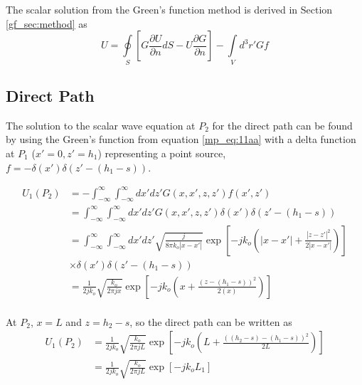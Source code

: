 The scalar solution from the Green's function method is derived in Section \ref{gf_sec:method} as
\begin{equation}
U = \oint\limits_{S}\left[G\frac{\partial U}{\partial n}dS - U\frac{\partial G}{\partial n} \right] -\int\limits_{V}d^3r' Gf
\label{mp_eq:11aaa}
\end{equation}
\renewcommand{\baselinestretch}{2} \small\normalsize

\subsection{Direct Path}
The solution to the scalar wave equation at $P_2$ for the direct path can be found by using the Green's function from equation \ref{mp_eq:11aa} with a delta function at $P_1$ ($x' = 0, z' = h_1$) representing a point source, $f = -\delta(x') \delta(z'- (h_1-s)) $.

\begin{equation}
\begin{aligned}
U_1(P_2) &= -\int_{-\infty}^{\infty} \int_{-\infty}^{\infty}dx' dz' G\left(x,x',z,z' \right) f(x',z') \\
&= \int_{-\infty}^{\infty} \int_{-\infty}^{\infty}dx' dz' G\left(x,x',z,z' \right)\delta(x') \delta(z'- (h_1-s)) \\
&= \int_{-\infty}^{\infty} \int_{-\infty}^{\infty}dx' dz' \sqrt{\frac{j}{8\pi k_o|x-x'|}}\exp\left[-jk_o\left(|x -x'| + \frac{|z-z'|^2}{2|x-x'|}\right) \right] \\
&\times \delta(x') \delta(z'- (h_1-s)) \\
&= \frac{1}{2jk_o}\sqrt{\frac{k_o}{2\pi jx}}\exp\left[-jk_o\left(x + \frac{(z-(h_1-s))^2}{2(x)}\right) \right]\\
\end{aligned}
\label{mp_eq:11ab}
\end{equation}
\renewcommand{\baselinestretch}{2} \small\normalsize

At $P_2$, $x = L$ and $z = h_2-s$, so the direct path can be written as
\begin{equation}
\begin{aligned}
U_1(P_2) &= \frac{1}{2jk_o}\sqrt{\frac{k_o}{2\pi jL}}\exp\left[-jk_o\left(L + \frac{((h_2-s)-(h_1-s))^2}{2L}\right) \right]\\
&=\frac{1}{2jk_o} \sqrt{\frac{k_o}{2\pi jL}}\exp\left[-jk_oL_1 \right]\\
\end{aligned}
\label{mp_eq:11ac}
\end{equation}
\renewcommand{\baselinestretch}{2} \small\normalsize

